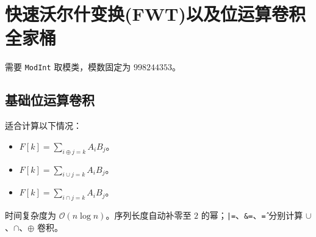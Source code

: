 \section{快速沃尔什变换(FWT)以及位运算卷积全家桶}

需要 \texttt{ModInt} 取模类，模数固定为 $998244353$。

\subsection{基础位运算卷积}

适合计算以下情况：

\begin{itemize}
    \item $F[k] = \sum_{i\oplus j=k} A_i B_j$。
    \item $F[k] = \sum_{i\cup j=k} A_i B_j$。
    \item $F[k] = \sum_{i\cap j=k} A_i B_j$。
\end{itemize}

时间复杂度为 $\mathcal{O}(n\log n)$。序列长度自动补零至 $2$ 的幂；\texttt{|=}、\texttt{\&=}、\texttt{\^=} 分别计算 $\cup$、$\cap$、$\oplus$ 卷积。

